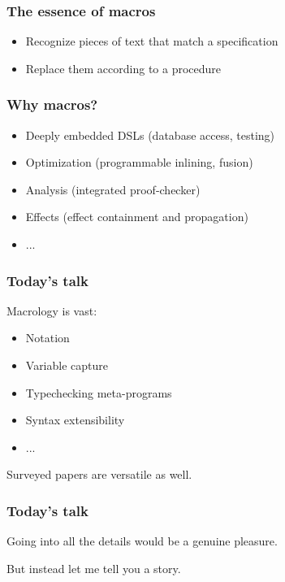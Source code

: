 \documentclass[hyperref={bookmarks=false}]{beamer}
\begin{document}
\begin{frame}[fragile]
\frametitle{The essence of macros}
\begin{itemize}
\item Recognize pieces of text that match a specification
\item Replace them according to a procedure
\end{itemize}
\end{frame}

\begin{frame}[fragile]
\frametitle{Why macros?}
\begin{itemize}
\item Deeply embedded DSLs (database access, testing)
\item Optimization (programmable inlining, fusion)
\item Analysis (integrated proof-checker)
\item Effects (effect containment and propagation)
\item ...
\end{itemize}
\end{frame}

\begin{frame}[fragile]
\frametitle{Today's talk}

Macrology is vast:
\begin{itemize}
\item Notation
\item Variable capture
\item Typechecking meta-programs
\item Syntax extensibility
\item ...
\end{itemize}

Surveyed papers are versatile as well.
\end{frame}

\begin{frame}[fragile]
\frametitle{Today's talk}

Going into all the details would be a genuine pleasure.

But instead let me tell you a story.
\end{frame}


\end{document}
